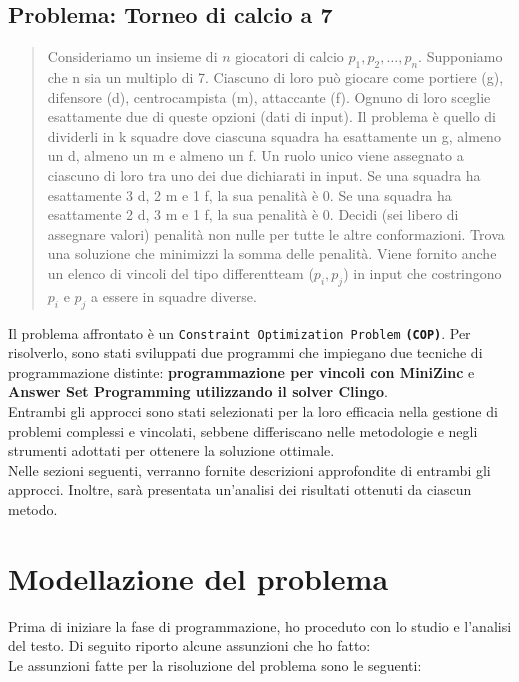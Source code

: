\documentclass{article}
\begin{document}
\begin{multicols*}{2}
\subsection{Problema: Torneo di calcio a 7}
\begin{quote}
    Consideriamo un insieme di \( n \) giocatori di calcio \( p_1, p_2, \ldots, p_n \).
    Supponiamo che n sia un multiplo di 7. 
    Ciascuno di loro può giocare come portiere (g), difensore (d), centrocampista (m), attaccante (f). 
    Ognuno di loro sceglie esattamente due di queste opzioni (dati di input).
    Il problema è quello di dividerli in k squadre dove ciascuna squadra ha esattamente un g, almeno un d, almeno un m e almeno un f. Un ruolo unico viene assegnato a ciascuno di loro tra uno dei due dichiarati in input.
    Se una squadra ha esattamente 3 d, 2 m e 1 f, la sua penalità è 0. Se una squadra ha esattamente 2 d, 3 m e 1 f, la sua penalità è 0. Decidi (sei libero di assegnare valori) penalità non nulle per tutte le altre conformazioni.
    Trova una soluzione che minimizzi la somma delle penalità.
    Viene fornito anche un elenco di vincoli del tipo differentteam (\( p_i, p_j\)) 
    in input che costringono \(p_i\) e \(p_j\) a essere in squadre diverse. 
\end{quote}
Il problema affrontato è un \texttt{Constraint Optimization Problem} \textbf{\texttt{(COP)}}. 
Per risolverlo, sono stati sviluppati due programmi che impiegano due tecniche di programmazione distinte: \textbf{programmazione per vincoli con MiniZinc} e \textbf{Answer Set Programming utilizzando il solver Clingo}.
\\
Entrambi gli approcci sono stati selezionati per la loro efficacia nella gestione di problemi complessi e vincolati, sebbene differiscano nelle metodologie e negli strumenti adottati per ottenere la soluzione ottimale. 
\\
Nelle sezioni seguenti, verranno fornite descrizioni approfondite di entrambi gli approcci.
Inoltre, sarà presentata un'analisi dei risultati ottenuti da ciascun metodo. 

\section{Modellazione del problema}
Prima di iniziare la fase di programmazione, ho proceduto con lo studio e l'analisi del testo. Di seguito riporto alcune assunzioni che ho fatto:
\\
Le assunzioni fatte per la risoluzione del problema sono le seguenti:


\end{multicols*}
\end{document}
